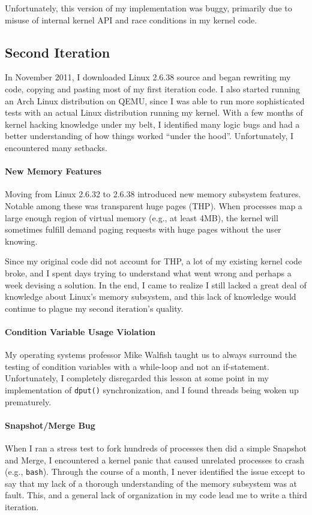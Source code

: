 Unfortunately, this version of my implementation was buggy, primarily due to
misuse of internal kernel API and race conditions in my kernel code.

\subsection{Second Iteration}
In November 2011, I downloaded Linux 2.6.38 source and began rewriting my code,
copying and pasting most of my first iteration code. I also started running
an Arch Linux distribution on QEMU, since I was able to run more sophisticated
tests with an actual Linux distribution running my kernel. With a few months of
kernel hacking knowledge under my belt, I identified many logic bugs and had a
better understanding of how things worked ``under the hood''. Unfortunately, I
encountered many setbacks.

\paragraph{New Memory Features}
Moving from Linux 2.6.32 to 2.6.38 introduced new memory subsystem features.
Notable among these was transparent huge pages (THP). When processes map a large
enough region of virtual memory (e.g., at least 4MB), the kernel will sometimes
fulfill demand paging requests with huge pages without the user knowing.

Since my original code did not account for THP, a lot of my existing kernel code
broke, and I spent days trying to understand what went wrong and perhaps a week
devising a solution. In the end, I came to realize I still lacked a great deal
of knowledge about Linux's memory subsystem, and this lack of knowledge would
continue to plague my second iteration's quality.

\paragraph{Condition Variable Usage Violation}
My operating systems professor Mike Walfish taught us to always surround
the testing of condition variables with a while-loop and not an if-statement.
Unfortunately, I completely disregarded this lesson at some point in my
implementation of {\tt dput()} synchronization, and I found threads being
woken up prematurely.

\paragraph{Snapshot/Merge Bug}
When I ran a stress test to fork hundreds of processes then did a simple
Snapshot and Merge, I encountered a kernel panic that caused unrelated processes
to crash (e.g., {\tt bash}). Through the course of a month, I never identified
the issue except to say that my lack of a thorough understanding of the memory
subsystem was at fault. This, and a general lack of organization in my code lead
me to write a third iteration.

